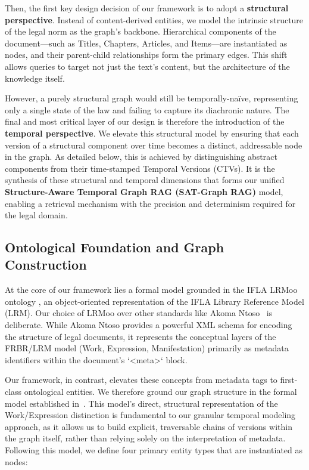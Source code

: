 \documentclass[11pt]{article}
\begin{document}
Then, the first key design decision of our framework is to adopt a \textbf{structural perspective}. Instead of content-derived entities, we model the intrinsic structure of the legal norm as the graph's backbone. Hierarchical components of the document—such as Titles, Chapters, Articles, and Items—are instantiated as nodes, and their parent-child relationships form the primary edges. This shift allows queries to target not just the text's content, but the architecture of the knowledge itself.

However, a purely structural graph would still be temporally-naïve, representing only a single state of the law and failing to capture its diachronic nature. The final and most critical layer of our design is therefore the introduction of the \textbf{temporal perspective}. We elevate this structural model by ensuring that each version of a structural component over time becomes a distinct, addressable node in the graph. As detailed below, this is achieved by distinguishing abstract components from their time-stamped Temporal Versions (CTVs). It is the synthesis of these structural and temporal dimensions that forms our unified \textbf{Structure-Aware Temporal Graph RAG (SAT-Graph RAG)} model, enabling a retrieval mechanism with the precision and determinism required for the legal domain.

\subsection{Ontological Foundation and Graph Construction}
\label{sec:ontology_construction}

At the core of our framework lies a formal model grounded in the IFLA LRMoo ontology \cite{lrmoo2024}, an object-oriented representation of the IFLA Library Reference Model (LRM). Our choice of LRMoo over other standards like Akoma Ntoso~\cite{palmirani2012legislativexml} is deliberate. While Akoma Ntoso provides a powerful XML schema for encoding the structure of legal documents, it represents the conceptual layers of the FRBR/LRM model (Work, Expression, Manifestation) primarily as metadata identifiers within the document's `<meta>` block. 

Our framework, in contrast, elevates these concepts from metadata tags to first-class ontological entities. We therefore ground our graph structure in the formal model established in~\cite{demartim2025temporal}. This model's direct, structural representation of the Work/Expression distinction is fundamental to our granular temporal modeling approach, as it allows us to build explicit, traversable chains of versions within the graph itself, rather than relying solely on the interpretation of metadata. Following this model, we define four primary entity types that are instantiated as nodes:
\end{document}
